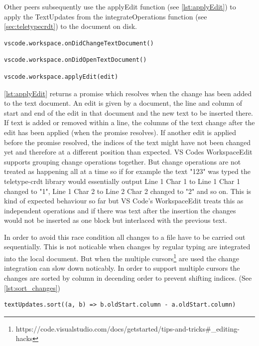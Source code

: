 Other peers subsequently use the applyEdit function (see \autoref{lst:applyEdit}) to apply the TextUpdates from the integrateOperations function (see \autoref{sec:teletypecrdt}) to the document on disk.

\begin{lstlisting}[label={lst:onDidChangeTextDocument}, caption=VS Code API onDidChangeTextDocument]
vscode.workspace.onDidChangeTextDocument()
\end{lstlisting}

\begin{lstlisting}[label={lst:onDidOpenTextDocument}, caption=VS Code API onDidOpenTextDocument]
vscode.workspace.onDidOpenTextDocument()
\end{lstlisting}

\begin{lstlisting}[label={lst:applyEdit}, caption=VS Code API applyEdit]
vscode.workspace.applyEdit(edit)
\end{lstlisting}

\autoref{lst:applyEdit} returns a promise which resolves when the change has been added to the text document.
An edit is given by a document, the line and column of start and end of the edit in that document and the new text to be inserted there.
If text is added or removed within a line, the columns of the text change after the edit has been applied (when the promise resolves). If another edit is applied before the promise resolved, the indices of the text might have not been changed yet and therefore at a different position than expected. VS Codes WorkspaceEdit supports grouping change operations together. But change operations are not treated as happening all at a time so if for example the text "123" was typed the teletype-crdt library would essentially output Line 1 Char 1 to Line 1 Char 1 changed to "1", Line 1 Char 2 to Line 2 Char 2 changed to "2" and so on. This is kind of expected behaviour so far but VS Code's WorkspaceEdit treats this as independent operations and if there was text after the insertion the changes would not be inserted as one block but interlaced with the previous text. 

In order to avoid this race condition all changes to a file have to be carried out sequentially. This is not noticable when changes by regular typing are integrated into the local document. But when the multiple cursors\footnote{https://code.visualstudio.com/docs/getstarted/tips-and-tricks\#\_editing-hacks} are used the change integration can slow down noticably. In order to support multiple cursors the changes are sorted by column in decending order to prevent shifting indices. (See \autoref{lst:sort_changes})
\begin{lstlisting}[label={lst:sort_changes}, caption=Sorting Changes by Column to Prevent Index Shifting]
textUpdates.sort((a, b) => b.oldStart.column - a.oldStart.column)
\end{lstlisting}


